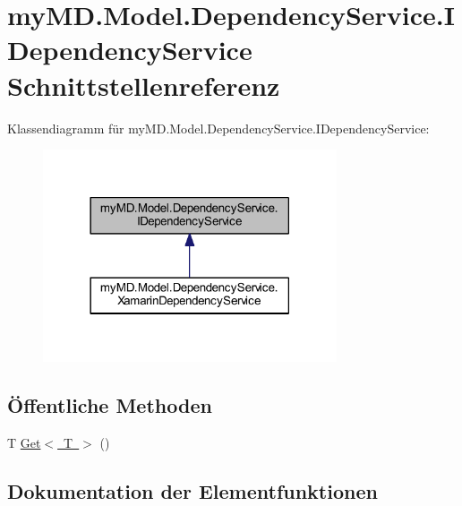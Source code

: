 \hypertarget{interfacemy_m_d_1_1_model_1_1_dependency_service_1_1_i_dependency_service}{}\section{my\+M\+D.\+Model.\+Dependency\+Service.\+I\+Dependency\+Service Schnittstellenreferenz}
\label{interfacemy_m_d_1_1_model_1_1_dependency_service_1_1_i_dependency_service}


Klassendiagramm für my\+M\+D.\+Model.\+Dependency\+Service.\+I\+Dependency\+Service\+:
\nopagebreak
\begin{figure}[H]
\begin{center}
\leavevmode
\includegraphics[width=246pt]{interfacemy_m_d_1_1_model_1_1_dependency_service_1_1_i_dependency_service__inherit__graph}
\end{center}
\end{figure}
\subsection*{Öffentliche Methoden}
\begin{DoxyCompactItemize}
\item 
T \mbox{\hyperlink{interfacemy_m_d_1_1_model_1_1_dependency_service_1_1_i_dependency_service_a2e088bfff9d0695a3a761faeeaba481e}{Get$<$ T $>$}} ()
\end{DoxyCompactItemize}


\subsection{Dokumentation der Elementfunktionen}
\mbox{\label{interfacemy_m_d_1_1_model_1_1_dependency_service_1_1_i_dependency_service_a2e088bfff9d0695a3a761faeeaba481e}} 
